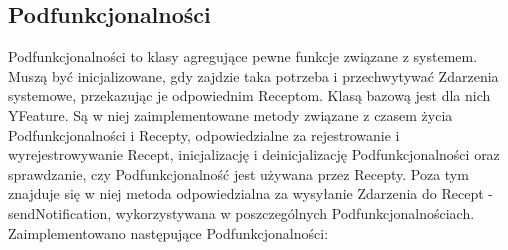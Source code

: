 \documentclass[11pt,a4paper,polish,thesis]{dcsbook}
\begin{document}
\subsection{Podfunkcjonalności}
Podfunkcjonalności to klasy agregujące pewne funkcje związane z systemem. Muszą być inicjalizowane, gdy zajdzie taka potrzeba i przechwytywać Zdarzenia systemowe, przekazując je odpowiednim Receptom. Klasą bazową jest dla nich YFeature. Są w niej zaimplementowane metody związane z czasem życia Podfunkcjonalności i Recepty, odpowiedzialne za rejestrowanie i wyrejestrowywanie Recept, inicjalizację i deinicjalizację Podfunkcjonalności oraz sprawdzanie, czy Podfunkcjonalność jest używana przez Recepty. Poza tym znajduje się w niej metoda odpowiedzialna za wysyłanie Zdarzenia do Recept - sendNotification, wykorzystywana w poszczególnych Podfunkcjonalnościach. Zaimplementowano następujące Podfunkcjonalności:
\end{document}
